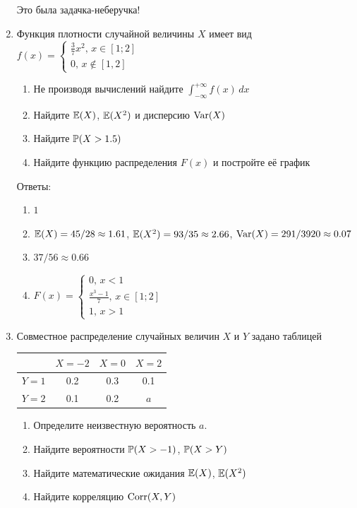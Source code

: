 \documentclass[12pt, a4paper]{article}\usepackage[]{graphicx}\usepackage[]{color}
\begin{document}
\begin{enumerate}
					Это была задачка-неберучка!


					\item Функция плотности случайной величины $X$ имеет вид $f(x)=\left\{\begin{array}{l}
					\frac{3}{7}x^2,\, x\in[1;2] \\
					0,\, x\notin [1,2]
					\end{array}\right.$
					\begin{enumerate}
						\item Не производя вычислений найдите $\int_{-\infty}^{+\infty}f(x)\,dx$
						\item Найдите $\E(X)$, $\E(X^2)$ и дисперсию $\Var(X)$
						\item Найдите $\P(X>1.5)$
						\item Найдите функцию распределения $F(x)$ и постройте её график
					\end{enumerate}

					Ответы:
					\begin{enumerate}
						\item $1$
						\item $\E(X)=45/28\approx 1.61$, $\E(X^2)=93/35\approx 2.66$, $\Var(X)=291/3920\approx 0.07$
						\item $37/56\approx 0.66$
						\item $F(x)=\begin{cases} 0,\, x<1 \\
						\frac{x^3-1}{7},\, x\in [1;2] \\
						1,\, x>1 \end{cases}$
					\end{enumerate}

					\item Совместное распределение случайных величин $X$ и $Y$ задано таблицей

					\begin{tabular}{c|ccc}
						& $X=-2$ & $X=0$ & $X=2$ \\
						\hline
						$Y=1$ & 0.2 & 0.3 & 0.1 \\
						$Y=2$ & 0.1 & 0.2 & $a$ \\
					\end{tabular}

					\begin{enumerate}
						\item Определите неизвестную вероятность $a$.
						\item Найдите вероятности $\P(X>-1)$, $\P(X>Y)$
						\item Найдите математические ожидания $\E(X)$, $\E(X^2)$
						\item Найдите корреляцию $\Corr(X,Y)$
					\end{enumerate}


\end{enumerate}
\end{document}
